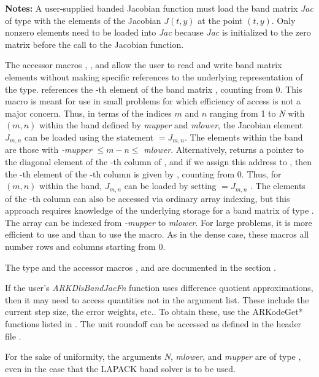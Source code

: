 \documentclass[letterpaper,10pt,english]{sphinxmanual}
\begin{document}
\begin{fulllineitems}
\textbf{Notes:} A user-supplied banded Jacobian function must load the band
matrix \emph{Jac} of type  with the elements of the Jacobian
\(J(t,y)\) at the point \((t,y)\). Only nonzero elements
need to be loaded into \emph{Jac} because \emph{Jac} is initialized to
the zero matrix before the call to the Jacobian function.

The accessor macros , , and
 allow the user to read and write band matrix
elements without making specific references to the underlying
representation of the  type.  
references the -th element of the band matrix ,
counting from 0. This macro is meant for use in small problems for
which efficiency of access is not a major concern. Thus, in terms
of the indices \(m\) and \(n\) ranging from 1 to \emph{N} with
\((m, n)\) within the band defined by \emph{mupper} and
\emph{mlower}, the Jacobian element \(J_{m,n}\) can be loaded
using the statement  \(=
J_{m,n}\). The elements within the band are those with \emph{-mupper}
\(\le m-n \le\) \emph{mlower}.  Alternatively, 
returns a pointer to the diagonal element of the -th column of
, and if we assign this address to , then
the -th element of the -th column is given by
, counting from 0. Thus, for
\((m,n)\) within the band, \(J_{m,n}\) can be loaded by
setting  \(= J_{m,n}\) . The elements of the -th column can
also be accessed via ordinary array indexing, but this approach
requires knowledge of the underlying storage for a band matrix of
type . The array  can be indexed from
\emph{-mupper} to \emph{mlower}. For large problems, it is more efficient
to use  and  than to use the
 macro. As in the dense case, these macros all number
rows and columns starting from 0.

The  type and the accessor macros ,
 and  are documented in the section
{\hyperref[linear_solvers/index:linearsolvers]{\emph{}}}.

If the user's \emph{ARKDlsBandJacFn} function uses difference quotient
approximations, then it may need to access quantities not in the
argument list.  These include the current step size, the error
weights, etc.. To obtain these, use the ARKodeGet* functions
listed in {\hyperref[c_interface/User_callable:cinterface-optionaloutputs]{\emph{}}}. The unit roundoff
can be accessed as  defined in the header file
.

For the sake of uniformity, the arguments \emph{N}, \emph{mlower}, and
\emph{mupper} are of type , even in the case that the
LAPACK band solver is to be used.

\end{fulllineitems}
\end{document}
